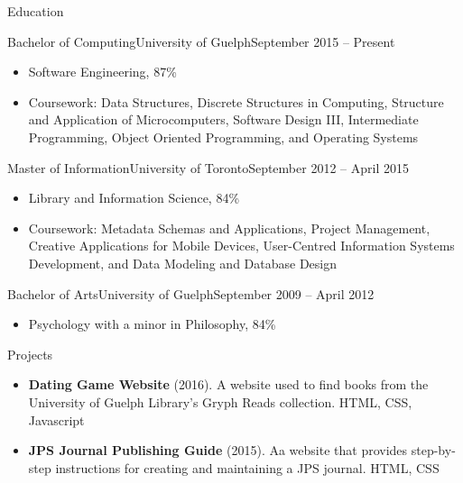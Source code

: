 \documentclass[]{mcdowellcv}
\begin{document}
	\begin{cvsection}{Education}
		\begin{cvsubsection}{Bachelor of Computing}{University of Guelph}{September 2015 -- Present}
			\begin{itemize}
				\item Software Engineering, 87\%
				\item Coursework: Data Structures, Discrete Structures in Computing, Structure and Application of Microcomputers, Software Design III, Intermediate Programming, Object Oriented Programming, and Operating Systems
			\end{itemize}
		\end{cvsubsection}
		\begin{cvsubsection}{Master of Information}{University of Toronto}{September 2012 -- April 2015}
			\begin{itemize}
				\item Library and Information Science, 84\%
				\item Coursework: Metadata Schemas and Applications, Project Management, Creative Applications for Mobile Devices, User-Centred Information Systems Development, and Data Modeling and Database Design
			\end{itemize}
		\end{cvsubsection}
		\begin{cvsubsection}{Bachelor of Arts}{University of Guelph}{September 2009 -- April 2012}
			\begin{itemize}
				\item Psychology with a minor in Philosophy, 84\%
			\end{itemize}
		\end{cvsubsection}
	\end{cvsection}
	
	\begin{cvsection}{Projects}
		\begin{cvsubsection}{}{}{}
			\begin{itemize}
				\item \textbf{Dating Game Website} (2016). A website used to find books from the University of Guelph Library's Gryph Reads collection. HTML, CSS, Javascript
				\item \textbf{JPS Journal Publishing Guide} (2015). Aa website that provides step-by-step instructions for creating and maintaining a JPS journal. HTML, CSS
			\end{itemize}
		\end{cvsubsection}
	\end{cvsection}
	
\end{document}
